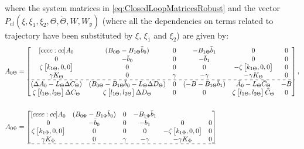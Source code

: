 \documentclass[main.tex]{subfiles}
\begin{document}
where the system matrices in \eqref{eq:ClosedLoopMatricesRobust} and the vector $P_{cl}(\xi,\xi_1,\xi_2, \Theta,\check{\Theta},W,W_y)$ (where all the dependencies on terms related to trajectory have been substituted by $\xi$, $\xi_1$ and $\xi_2$) are given by:
\begingroup
\renewcommand*{\arraystretch}{1.5}
\begin{align*}
A_{0\Theta} &= 
\begin{bmatrix}[cccc:cc]
A_0 & (B_{0\Theta} - B_{1\Theta} \bar{b}_0) & 0 & -B_{1\Theta}\bar{b} _1 & 0 & 0\\
%
0 & -\bar{b}_0 & 0 & -\bar{b}_1 & 0 & 0\\
\zeta \begin{bmatrix}k_{1\Theta} , 0 , 0\end{bmatrix} & 0 & 0 & 0 & -\zeta\begin{bmatrix}k_{1\Theta} , 0 , 0\end{bmatrix} & 0\\
%
\gamma K_\Theta & 0 & \gamma & -\gamma & -\gamma K_\Theta & 0\\ \hdashline
%
(\Delta A_0 - L_\Theta \Delta C_\Theta) & (B_{0\Theta} - B_{1\Theta} \bar{b}_0 - L_\Theta \Delta D_\Theta) & 0 & (-B -B_{1\Theta}\bar{b}_1) & \bar{A}_0 - L_\Theta \bar{C}_\Theta & -B\\ 
%
\zeta \begin{bmatrix}l_{1\Theta} , l_{2\Theta}	\end{bmatrix} \Delta C_\Theta & \zeta \begin{bmatrix}l_{1\Theta} , l_{2\Theta}	\end{bmatrix} \Delta D_\Theta & 0 & 0 & \zeta \begin{bmatrix}l_{1\Theta} , l_{2\Theta}	\end{bmatrix} \bar{C}_\Theta & 0
\end{bmatrix},\\
\nonumber \\
%
%
%
A_{0\Phi} &= 
\begin{bmatrix}[cccc:cc]
A_0 &(B_{0\Phi} - B_{1\Phi} \bar{b}_0) & 0 & -B_{1\Phi}\bar{b} _1\\
%
0 & -\bar{b}_0 & 0 & -\bar{b}_1 & 0 & 0 \\
%
\zeta \begin{bmatrix}k_{1\Phi} , 0 , 0\end{bmatrix} & 0 & 0 & 0 & -\zeta\begin{bmatrix}k_{1\Phi} , 0 , 0\end{bmatrix} & 0 \\
%
\gamma K_{\Phi} & 0 & \gamma & -\gamma & -\gamma K_{\Phi} & 0\\ \hdashline

\end{bmatrix}
\end{align*}
\end{document}
